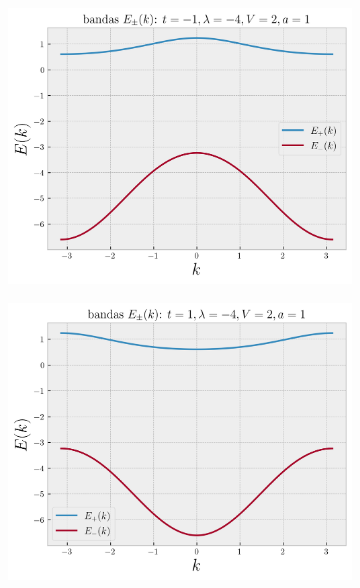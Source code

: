 \documentclass[a4paper,10pt]{article}
\begin{document}
\begin{figure}[H]
\centering
\begin{subfigure}{.46\textwidth}
  \centering
  \includegraphics[width=0.95\linewidth]{fig/bandas-anderson1.png}
  \label{fig:bandas-anderson1}
\end{subfigure}
\begin{subfigure}{.46\textwidth}
  \centering
  \includegraphics[width=0.95\linewidth]{fig/bandas-anderson2.png}
  \label{fig:bandas-anderson2}
\end{subfigure}
\label{fig:bandas-anderson11}
\end{figure}
\end{document}
